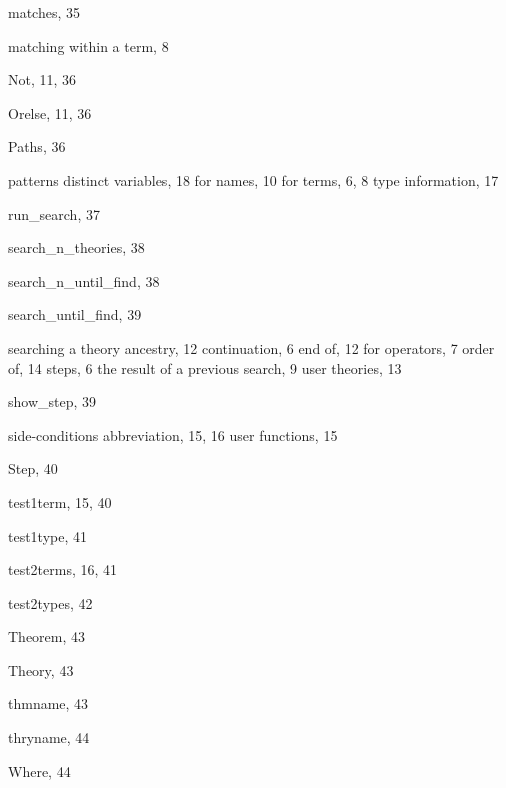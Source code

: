 \begin{theindex}
  \indexspace

  \item {\ptt matches}, 35
  \item matching
    \subitem within a term, 8

  \indexspace

  \item {\ptt Not}, 11, 36

  \indexspace

  \item {\ptt Orelse}, 11, 36

  \indexspace

  \item {\ptt Paths}, 36
  \item patterns
    \subitem distinct variables, 18
    \subitem for names, 10
    \subitem for terms, 6, 8
    \subitem type information, 17

  \indexspace

  \item {\ptt run\_search}, 37

  \indexspace

  \item {\ptt search\_n\_theories}, 38
  \item {\ptt search\_n\_until\_find}, 38
  \item {\ptt search\_until\_find}, 39
  \item searching
    \subitem a theory ancestry, 12
    \subitem continuation, 6
    \subitem end of, 12
    \subitem for operators, 7
    \subitem order of, 14
    \subitem steps, 6
    \subitem the result of a previous search, 9
    \subitem user theories, 13
  \item {\ptt show\_step}, 39
  \item side-conditions
    \subitem abbreviation, 15, 16
    \subitem user functions, 15
  \item {\ptt Step}, 40

  \indexspace

  \item {\ptt test1term}, 15, 40
  \item {\ptt test1type}, 41
  \item {\ptt test2terms}, 16, 41
  \item {\ptt test2types}, 42
  \item {\ptt Theorem}, 43
  \item {\ptt Theory}, 43
  \item {\ptt thmname}, 43
  \item {\ptt thryname}, 44

  \indexspace

  \item {\ptt Where}, 44

\end{theindex}
